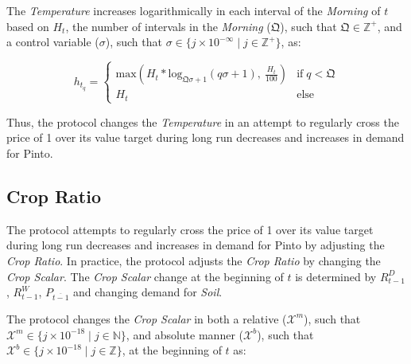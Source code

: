\documentclass[tikz]{article}
\newcommand{\term}[1]{\textsl{#1}}
\newcommand{\Pinto}{} %
\begin{document}
The \term{Temperature} increases logarithmically in each interval of the \term{Morning} of $t$ based on $H_{t}$, the number of intervals in the \term{Morning} ($\mathfrak{Q}$), such that $\mathfrak{Q} \in \mathbb{Z}^{+}$, and a control variable ($\sigma$), such that $\sigma \in \{j \times 10^{-\infty} \mid j \in \mathbb{Z}^{+} \}$, as:

\vspace{-0.025cm}

    $$ 
        h_{t_{q}} =
            \begin{cases}
                \text{max}(
                        H_{t}*\text{log}_{\mathfrak{Q}\sigma + 1}(q\sigma + 1),\ 
                        \frac{H_{t}}{100})
                    & \text{if} \; q < \mathfrak{Q} \\
                    
                H_{t} 
                    & \text{else}
            \end{cases} 
    $$

\vspace{-0.025cm}

Thus, the protocol changes the \term{Temperature} in an attempt to regularly cross the price of \Pinto1 over its value target during long run decreases and increases in demand for Pinto.


\vspace{-0.025cm}
\subsection{Crop Ratio}
\vspace{-0.025cm}

The protocol attempts to regularly cross the price of \Pinto1 over its value target during long run decreases and increases in demand for Pinto by adjusting the \term{Crop Ratio}. In practice, the protocol adjusts the \term{Crop Ratio} by changing the \term{Crop Scalar}. The \term{Crop Scalar} change at the beginning of $t$ is determined by $R_{t-1}^{D}$, $R_{t-1}^{W}$, $P_{\overline{t-1}}$ and changing demand for \term{Soil}. 

\vspace{-0.025cm}

The protocol changes the \term{Crop Scalar} in both a relative ($\mathscr{X}^{m}$), such that $\mathscr{X}^{m} \in \{j \times 10^{-18} \mid j \in \mathbb{N} \}$, and absolute manner ($\mathscr{X}^{b}$), such that $\mathscr{X}^{b} \in \{j \times 10^{-18} \mid j \in \mathbb{Z} \}$, at the beginning of $t$ as:
\end{document}
